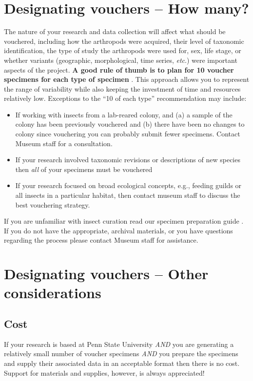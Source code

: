 \documentclass[letterpaper, 11pt]{article}
\begin{document}
\section{Designating vouchers -- How many?}
The nature of your research and data collection will affect what should be vouchered, including how the arthropods were acquired, their level of taxonomic identification, the type of study the arthropods were used for, sex, life stage, or whether variants (geographic, morphological, time series, \textit{etc}.) were important aspects of the project. \textbf{A good rule of thumb is to plan for 10 voucher specimens for each type of specimen} \cite{2,5}. This approach allows you to represent the range of variability while also keeping the investment of time and resources relatively low. Exceptions to the ``10 of each type'' recommendation may include:
\begin{itemize}
\item If working with insects from a lab-reared colony, and (a) a sample of the colony has been previously vouchered and (b) there have been no changes to colony since vouchering you can probably submit fewer specimens. Contact Museum staff for a consultation.
\item If your research involved taxonomic revisions or descriptions of new species then \textit{all} of your specimens must be vouchered
\item If your research focused on broad ecological concepts, e.g., feeding guilds or all insects in a particular habitat, then contact museum staff to discuss the best vouchering strategy.
\end{itemize}

If you are unfamiliar with insect curation read our specimen preparation guide \citep{specimenPrep}. If you do not have the appropriate, archival materials, or you have questions regarding the process please contact Museum staff for assistance.

\section{Designating vouchers -- Other considerations}
\subsection{Cost}

If your research is based at Penn State University \textit{AND} you are generating a relatively small number of voucher specimens \textit{AND} you prepare the specimens and supply their associated data in an acceptable format then there is no cost. Support for materials and supplies, however, is always appreciated!
\end{document}
